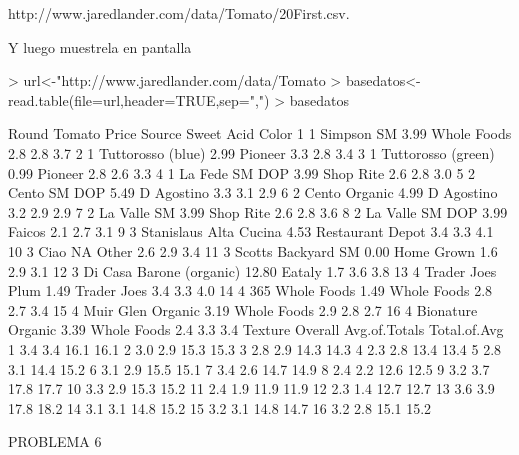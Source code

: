 \documentclass{article}
\begin{document}
http://www.jaredlander.com/data/Tomato/20First.csv.

Y luego muestrela en pantalla
\begin{Schunk}
\begin{Sinput}
> url<-"http://www.jaredlander.com/data/Tomato%20First.csv"
> basedatos<-read.table(file=url,header=TRUE,sep=",")
> basedatos
\end{Sinput}
\begin{Soutput}
   Round                   Tomato Price           Source Sweet Acid Color
1      1               Simpson SM  3.99      Whole Foods   2.8  2.8   3.7
2      1        Tuttorosso (blue)  2.99          Pioneer   3.3  2.8   3.4
3      1       Tuttorosso (green)  0.99          Pioneer   2.8  2.6   3.3
4      1           La Fede SM DOP  3.99        Shop Rite   2.6  2.8   3.0
5      2             Cento SM DOP  5.49       D Agostino   3.3  3.1   2.9
6      2            Cento Organic  4.99       D Agostino   3.2  2.9   2.9
7      2              La Valle SM  3.99        Shop Rite   2.6  2.8   3.6
8      2          La Valle SM DOP  3.99           Faicos   2.1  2.7   3.1
9      3   Stanislaus Alta Cucina  4.53 Restaurant Depot   3.4  3.3   4.1
10     3                     Ciao    NA            Other   2.6  2.9   3.4
11     3       Scotts Backyard SM  0.00       Home Grown   1.6  2.9   3.1
12     3 Di Casa Barone (organic) 12.80           Eataly   1.7  3.6   3.8
13     4         Trader Joes Plum  1.49      Trader Joes   3.4  3.3   4.0
14     4          365 Whole Foods  1.49      Whole Foods   2.8  2.7   3.4
15     4        Muir Glen Organic  3.19      Whole Foods   2.9  2.8   2.7
16     4        Bionature Organic  3.39      Whole Foods   2.4  3.3   3.4
   Texture Overall Avg.of.Totals Total.of.Avg
1      3.4     3.4          16.1         16.1
2      3.0     2.9          15.3         15.3
3      2.8     2.9          14.3         14.3
4      2.3     2.8          13.4         13.4
5      2.8     3.1          14.4         15.2
6      3.1     2.9          15.5         15.1
7      3.4     2.6          14.7         14.9
8      2.4     2.2          12.6         12.5
9      3.2     3.7          17.8         17.7
10     3.3     2.9          15.3         15.2
11     2.4     1.9          11.9         11.9
12     2.3     1.4          12.7         12.7
13     3.6     3.9          17.8         18.2
14     3.1     3.1          14.8         15.2
15     3.2     3.1          14.8         14.7
16     3.2     2.8          15.1         15.2
\end{Soutput}
\end{Schunk}
PROBLEMA 6
\end{document}
